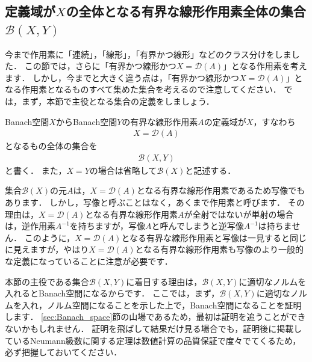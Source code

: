 \subsection{定義域が\texorpdfstring{$X$}{X}の全体となる有界な線形作用素全体の集合\texorpdfstring{${\mathcal B}(X, Y)$}{B(X,Y)}}\label{sec:DX_bounded_linear_op}
今まで作用素に「連続」，「線形」，「有界かつ線形」などのクラス分けをしました．
この節では，さらに「有界かつ線形かつ$X = {\mathcal D}(A)$」となる作用素を考えます．
しかし，今までと大きく違う点は，「有界かつ線形かつ$X = {\mathcal D}(A)$」となる作用素となるものすべて集めた集合を考えるので注意してください．
では，まず，本節で主役となる集合の定義をしましょう．

\begin{defi}\label{def:set_bound_linear_operator}
	Banach空間$X$からBanach空間$Y$の有界な線形作用素$A$の定義域が$X$，すなわち
	\begin{align*}
	 X = {\mathcal D}(A)
	\end{align*}
	となるもの全体の集合を
	\begin{align*}
	 {\mathcal B}(X, Y)
	\end{align*}
	と書く．
	また，$X = Y$の場合は省略して${\mathcal B}(X)$と記述する．
\end{defi}

集合${\mathcal B}(X)$の元$A$は，$X = {\mathcal D}(A)$となる有界な線形作用素であるため写像でもあります．
しかし，写像と呼ぶことはなく，あくまで作用素と呼びます．
その理由は，$X = {\mathcal D}(A)$となる有界な線形作用素$A$が全射ではないが単射の場合は，逆作用素$A^{-1}$を持ちますが，写像$A$と呼んでしまうと逆写像$A^{-1}$は持ちません．
このように，$X = {\mathcal D}(A)$となる有界な線形作用素と写像は一見すると同じに見えますが，やはり$X = {\mathcal D}(A)$となる有界な線形作用素も写像のより一般的な定義になっていることに注意が必要です．


本節の主役である集合${\mathcal B}(X, Y)$に着目する理由は，${\mathcal B}(X, Y)$に適切なノルムを入れるとBanach空間になるからです．
ここでは，まず，${\mathcal B}(X, Y)$に適切なノルムを入れ，ノルム空間になることを示した上で，Banach空間になることを証明します．
\ref{sec:Banach_space}節の山場であるため，最初は証明を追うことができないかもしれません．
証明を飛ばして結果だけ見る場合でも，証明後に掲載しているNeumann級数に関する定理は数値計算の品質保証で度々でてくるため，必ず把握しておいてください．

